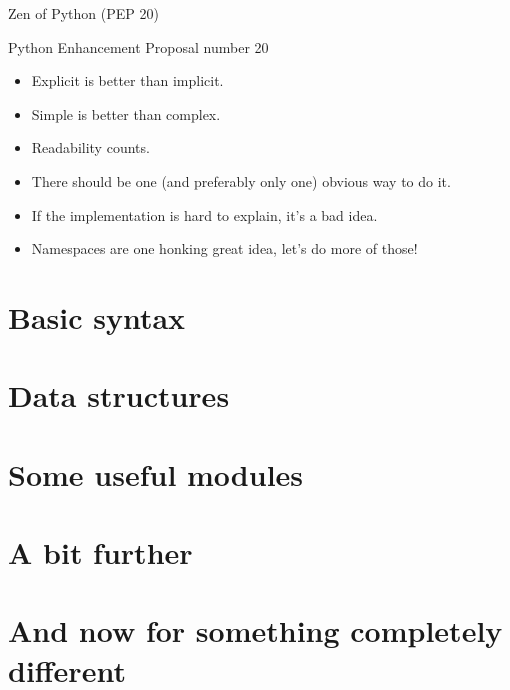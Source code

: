 \documentclass[ignorenonframetext,]{beamer}
\begin{document}
\begin{frame}{Zen of Python (PEP 20)}

    Python Enhancement Proposal number 20

    \begin{itemize}
        \item<1-2> Explicit is better than implicit.
        \item<1-2> Simple is better than complex.
        \item<1-2> Readability counts.
        \item<1-2> There should be one (and preferably only one) obvious way to do it.
        \item<1-2> If the implementation is hard to explain, it's a bad idea.
        \item<1-2> Namespaces are one honking great idea, let's do more of those!
    \end{itemize}
\end{frame}

\section{Basic syntax}\label{basic-syntax}

\section{Data structures}\label{data-structures}

\section{Some useful modules}\label{some-useful-modules}

\section{A bit further}\label{a-bit-further}

\section{And now for something completely
different}\label{and-now-for-something-completely-different}
\end{document}
